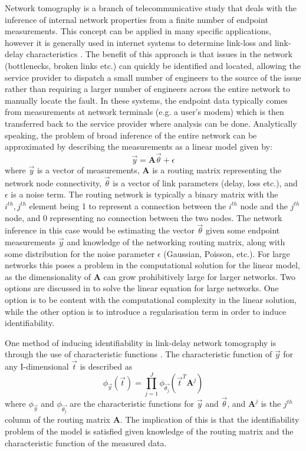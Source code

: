 Network tomography is a branch of telecommunicative study that deals with the inference of internal network properties from a finite number of endpoint measurements. This concept can be applied in many specific applications, however it is generally used in internet systems to determine link-loss and link-delay characteristics \cite{intTom}. The benefit of this approach is that issues in the network (bottlenecks, broken links etc.) can quickly be identified and located, allowing the service provider to dispatch a small number of engineers to the source of the issue rather than requiring a larger number of engineers across the entire network to manually locate the fault. In these systems, the endpoint data typically comes from measurements at network terminals (e.g. a user's modem) which is then transferred back to the service provider where analysis can be done. Analytically speaking, the problem of broad inference of the entire network can be approximated by describing the measurements as a linear model \cite{intTom} given by:
\begin{equation}
    \label{generalNetTom}
    \vec{y}=\boldsymbol{A}\vec{\theta}+\epsilon
\end{equation}
where $\vec{y}$ is a vector of measurements, $\boldsymbol{A}$ is a routing matrix representing the network node connectivity, $\vec{\theta}$ is a vector of link parameters (delay, loss etc.), and $\epsilon$ is a noise term. The routing network is typically a binary matrix with the $i^{th},j^{th}$ element being 1 to represent a connection between the $i^{th}$ node and the $j^{th}$ node, and 0 representing no connection between the two nodes. The network inference in this case would be estimating the vector $\vec{\theta}$ given some endpoint measurements $\vec{y}$ and knowledge of the networking routing matrix, along with some distribution for the noise parameter $\epsilon$ (Gaussian, Poisson, etc.). For large networks this poses a problem in the computational solution for the linear model, as the dimensionality of $\boldsymbol{A}$ can grow prohibitively large for larger networks. Two options are discussed in \cite{intTom} to solve the linear equation for large networks. One option is to be content with the computational complexity in the linear solution, while the other option is to introduce a regularisation term in order to induce identifiability.
\par
One method of inducing identifiability in link-delay network tomography is through the use of characteristic functions \cite{netTomFour}. The characteristic function of $\vec{y}$ for any I-dimensional $\vec{t}$ is described as
\begin{equation}
    \label{linkDelayCF}
    \phi_{\vec{y}}(\vec{t}) = \prod_{j=1}^{J}\phi_{\vec{\theta_{j}}}(\vec{t}^{T}\boldsymbol{A}^{j})
\end{equation}
where $\phi_{\vec{y}}$ and $\phi_{\vec{\theta_{j}}}$ are the characteristic functions for $\vec{y}$ and $\vec{\theta}$, and $\boldsymbol{A}^{j}$ is the $j^{th}$ column of the routing matrix $\boldsymbol{A}$. The implication of this is that the identifiability problem of the model is satisfied given knowledge of the routing matrix and the characteristic function of the measured data.

